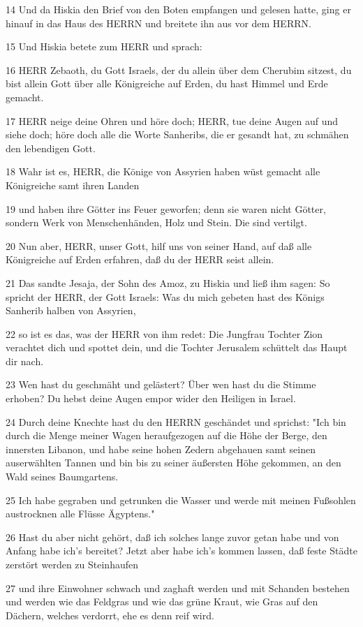 \par 14 Und da Hiskia den Brief von den Boten empfangen und gelesen hatte, ging er hinauf in das Haus des HERRN und breitete ihn aus vor dem HERRN.
\par 15 Und Hiskia betete zum HERR und sprach:
\par 16 HERR Zebaoth, du Gott Israels, der du allein über dem Cherubim sitzest, du bist allein Gott über alle Königreiche auf Erden, du hast Himmel und Erde gemacht.
\par 17 HERR neige deine Ohren und höre doch; HERR, tue deine Augen auf und siehe doch; höre doch alle die Worte Sanheribs, die er gesandt hat, zu schmähen den lebendigen Gott.
\par 18 Wahr ist es, HERR, die Könige von Assyrien haben wüst gemacht alle Königreiche samt ihren Landen
\par 19 und haben ihre Götter ins Feuer geworfen; denn sie waren nicht Götter, sondern Werk von Menschenhänden, Holz und Stein. Die sind vertilgt.
\par 20 Nun aber, HERR, unser Gott, hilf uns von seiner Hand, auf daß alle Königreiche auf Erden erfahren, daß du der HERR seist allein.
\par 21 Das sandte Jesaja, der Sohn des Amoz, zu Hiskia und ließ ihm sagen: So spricht der HERR, der Gott Israels: Was du mich gebeten hast des Königs Sanherib halben von Assyrien,
\par 22 so ist es das, was der HERR von ihm redet: Die Jungfrau Tochter Zion verachtet dich und spottet dein, und die Tochter Jerusalem schüttelt das Haupt dir nach.
\par 23 Wen hast du geschmäht und gelästert? Über wen hast du die Stimme erhoben? Du hebst deine Augen empor wider den Heiligen in Israel.
\par 24 Durch deine Knechte hast du den HERRN geschändet und sprichst: "Ich bin durch die Menge meiner Wagen heraufgezogen auf die Höhe der Berge, den innersten Libanon, und habe seine hohen Zedern abgehauen samt seinen auserwählten Tannen und bin bis zu seiner äußersten Höhe gekommen, an den Wald seines Baumgartens.
\par 25 Ich habe gegraben und getrunken die Wasser und werde mit meinen Fußsohlen austrocknen alle Flüsse Ägyptens."
\par 26 Hast du aber nicht gehört, daß ich solches lange zuvor getan habe und von Anfang habe ich's bereitet? Jetzt aber habe ich's kommen lassen, daß feste Städte zerstört werden zu Steinhaufen
\par 27 und ihre Einwohner schwach und zaghaft werden und mit Schanden bestehen und werden wie das Feldgras und wie das grüne Kraut, wie Gras auf den Dächern, welches verdorrt, ehe es denn reif wird.

